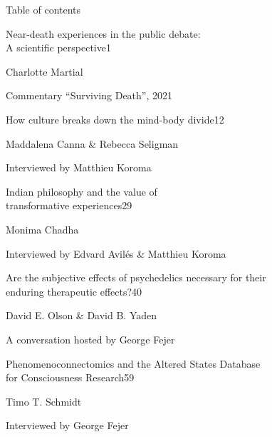 \AliusIssueBlankPage

\clearpage
\thispagestyle{empty}
\vspace*{2.8cm}
{\AliusLato\fontsize{20}{24}\selectfont Table of contents\par}
\vspace{1.2cm}
{\AliusLatoLight\fontsize{12}{15}\selectfont Near-death experiences in the public debate:\\A scientific perspective\hfill 1\par}
{\AliusLatoLight\fontsize{12}{15}\selectfont Charlotte Martial\par}
{\AliusLatoLight\fontsize{12}{15}\selectfont Commentary ``Surviving Death'', 2021\par}
\vspace{1.0em}
{\AliusLatoLight\fontsize{12}{15}\selectfont How culture breaks down the mind-body divide\hfill 12\par}
{\AliusLatoLight\fontsize{12}{15}\selectfont Maddalena Canna \& Rebecca Seligman\par}
{\AliusLatoLight\fontsize{12}{15}\selectfont Interviewed by Matthieu Koroma\par}
\vspace{1.0em}
{\AliusLatoLight\fontsize{12}{15}\selectfont Indian philosophy and the value of\\transformative experiences\hfill 29\par}
{\AliusLatoLight\fontsize{12}{15}\selectfont Monima Chadha\par}
{\AliusLatoLight\fontsize{12}{15}\selectfont Interviewed by Edvard Avilés \& Matthieu Koroma\par}
\vspace{1.0em}
{\AliusLatoLight\fontsize{12}{15}\selectfont Are the subjective effects of psychedelics necessary for their\\enduring therapeutic effects?\hfill 40\par}
{\AliusLatoLight\fontsize{12}{15}\selectfont David E. Olson \& David B. Yaden\par}
{\AliusLatoLight\fontsize{12}{15}\selectfont A conversation hosted by George Fejer\par}
\vspace{1.0em}
{\AliusLatoLight\fontsize{12}{15}\selectfont Phenomenoconnectomics and the Altered States Database\\for Consciousness Research\hfill 59\par}
{\AliusLatoLight\fontsize{12}{15}\selectfont Timo T. Schmidt\par}
{\AliusLatoLight\fontsize{12}{15}\selectfont Interviewed by George Fejer\par}
\clearpage

\AliusIssueBlankPage
